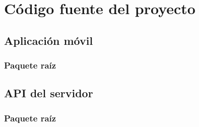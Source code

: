 \chapter{Código fuente del proyecto}
\label{chapter:codigo}

\section{Aplicación móvil}
    \subsection{Paquete raíz}
        
        
        

\section{API del servidor}
    \subsection{Paquete raíz}
        
        
        
        
        
        
